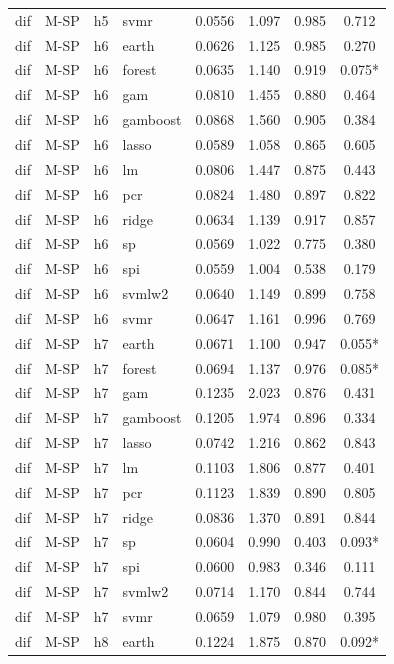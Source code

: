\begin{ThreePartTable}
\begin{longtable}[t]{llclcccc}
dif & M-SP & h5 & svmr & 0.0556 & 1.097 & 0.985 & 0.712\\
\addlinespace
dif & M-SP & h6 & earth & 0.0626 & 1.125 & 0.985 & 0.270\\
dif & M-SP & h6 & forest & 0.0635 & 1.140 & 0.919 & 0.075*\\
dif & M-SP & h6 & gam & 0.0810 & 1.455 & 0.880 & 0.464\\
dif & M-SP & h6 & gamboost & 0.0868 & 1.560 & 0.905 & 0.384\\
dif & M-SP & h6 & lasso & 0.0589 & 1.058 & 0.865 & 0.605\\
dif & M-SP & h6 & lm & 0.0806 & 1.447 & 0.875 & 0.443\\
dif & M-SP & h6 & pcr & 0.0824 & 1.480 & 0.897 & 0.822\\
dif & M-SP & h6 & ridge & 0.0634 & 1.139 & 0.917 & 0.857\\
dif & M-SP & h6 & sp & 0.0569 & 1.022 & 0.775 & 0.380\\
dif & M-SP & h6 & spi & 0.0559 & 1.004 & 0.538 & 0.179\\
dif & M-SP & h6 & svmlw2 & 0.0640 & 1.149 & 0.899 & 0.758\\
dif & M-SP & h6 & svmr & 0.0647 & 1.161 & 0.996 & 0.769\\
\addlinespace
dif & M-SP & h7 & earth & 0.0671 & 1.100 & 0.947 & 0.055*\\
dif & M-SP & h7 & forest & 0.0694 & 1.137 & 0.976 & 0.085*\\
dif & M-SP & h7 & gam & 0.1235 & 2.023 & 0.876 & 0.431\\
dif & M-SP & h7 & gamboost & 0.1205 & 1.974 & 0.896 & 0.334\\
dif & M-SP & h7 & lasso & 0.0742 & 1.216 & 0.862 & 0.843\\
dif & M-SP & h7 & lm & 0.1103 & 1.806 & 0.877 & 0.401\\
dif & M-SP & h7 & pcr & 0.1123 & 1.839 & 0.890 & 0.805\\
dif & M-SP & h7 & ridge & 0.0836 & 1.370 & 0.891 & 0.844\\
dif & M-SP & h7 & sp & 0.0604 & 0.990 & 0.403 & 0.093*\\
dif & M-SP & h7 & spi & 0.0600 & 0.983 & 0.346 & 0.111\\
dif & M-SP & h7 & svmlw2 & 0.0714 & 1.170 & 0.844 & 0.744\\
dif & M-SP & h7 & svmr & 0.0659 & 1.079 & 0.980 & 0.395\\
\addlinespace
dif & M-SP & h8 & earth & 0.1224 & 1.875 & 0.870 & 0.092*\\

\end{longtable}
\end{ThreePartTable}
